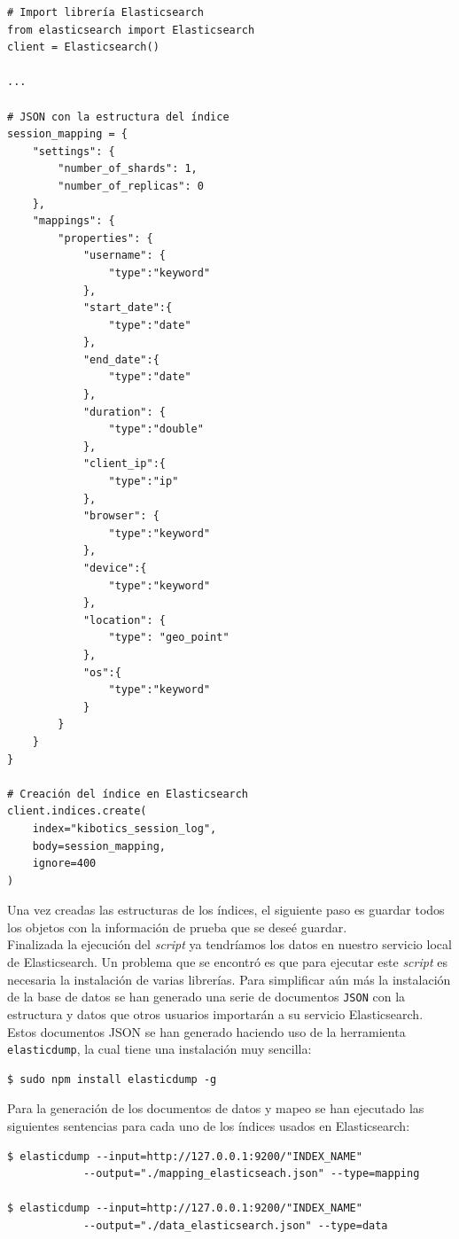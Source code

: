 \documentclass[11pt,a4paper]{book}
\begin{document}
				\begin{Verbatim}[tabsize=4]
# Import librería Elasticsearch
from elasticsearch import Elasticsearch
client = Elasticsearch()

...

# JSON con la estructura del índice
session_mapping = {
	"settings": {
		"number_of_shards": 1,
		"number_of_replicas": 0
	},
	"mappings": {
		"properties": {
			"username": {
				"type":"keyword"
			},
			"start_date":{
				"type":"date"
			},
			"end_date":{
				"type":"date"
			},
			"duration": {
				"type":"double"
			},
			"client_ip":{
				"type":"ip"
			},
			"browser": {
				"type":"keyword"
			},
			"device":{
				"type":"keyword"
			},
			"location": {
				"type": "geo_point"
			},
			"os":{
				"type":"keyword"
			}
		}
	}
}

# Creación del índice en Elasticsearch
client.indices.create(
	index="kibotics_session_log",
	body=session_mapping,
	ignore=400
)
				\end{Verbatim}
				
				Una vez creadas las estructuras de los índices, el siguiente paso es guardar todos los objetos con la información de prueba que se deseé guardar.\\
				
				Finalizada la ejecución del \textit{script} ya tendríamos los datos en nuestro servicio local de Elasticsearch. Un problema que se encontró es que para ejecutar este \textit{script} es necesaria la instalación de varias librerías. Para simplificar aún más la instalación de la base de datos se han generado una serie de documentos \texttt{JSON} con la estructura y datos que otros usuarios importarán a su servicio Elasticsearch.\\
				
				Estos documentos JSON se han generado haciendo uso de la herramienta \texttt{elasticdump}, la cual tiene una instalación muy sencilla:
							
				\begin{Verbatim}[tabsize=4]
$ sudo npm install elasticdump -g
				\end{Verbatim}
				
				Para la generación de los documentos de datos y mapeo se han ejecutado las siguientes sentencias para cada uno de los índices usados en Elasticsearch:

				\begin{Verbatim}[tabsize=4]
$ elasticdump --input=http://127.0.0.1:9200/"INDEX_NAME" 
			--output="./mapping_elasticseach.json" --type=mapping
			
$ elasticdump --input=http://127.0.0.1:9200/"INDEX_NAME" 
			--output="./data_elasticsearch.json" --type=data

				\end{Verbatim}
				
\end{document}
